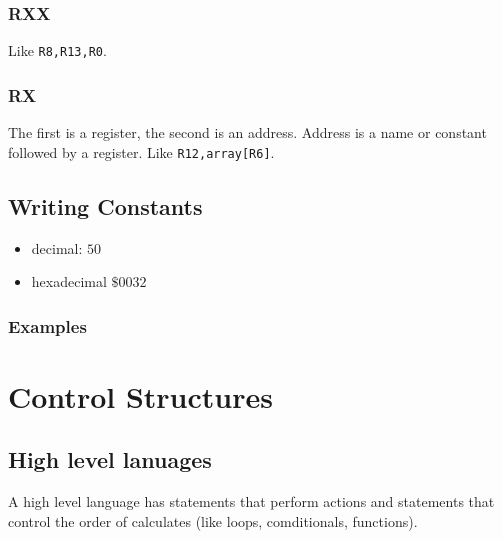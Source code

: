 \subsubsection{RXX}\label{ssub:rxx}

Like \texttt{R8,R13,R0}.

\subsubsection{RX}\label{ssub:rx}

The first is a register, the second is an address.
Address is a name or constant followed by a register.
Like \texttt{R12,array[R6]}.

\subsection{Writing Constants}\label{sub:writing_constants}

\begin{itemize}
    \item decimal: \(50\)
    \item hexadecimal \(\$0032\)
\end{itemize}

\subsubsection{Examples}\label{ssub:examples}


\section{Control Structures}\label{sec:control_structures}

\subsection{High level lanuages}\label{sub:high_level_lanuages}

A high level language has statements that perform actions and statements that control the order of calculates (like loops, comditionals, functions).

